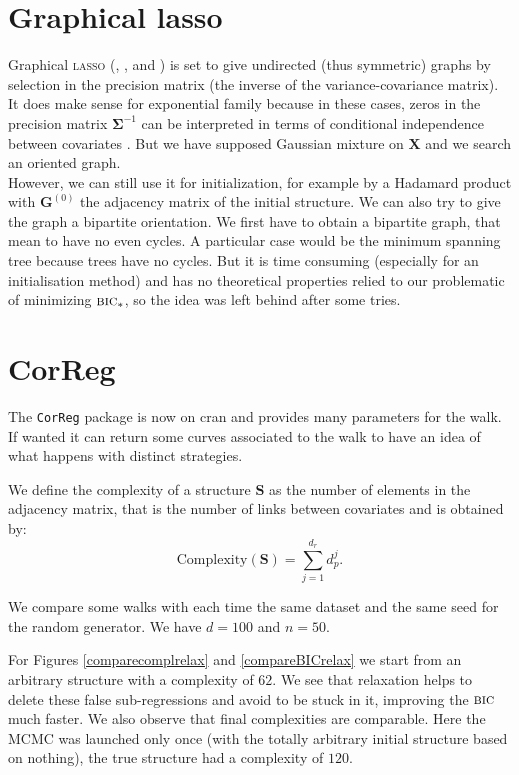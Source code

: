 \documentclass[12pt,a4paper]{report}
\begin{document}
	\section{Graphical { \sc lasso}}\label{sectionGlasso}
		Graphical \textsc{lasso} (\cite{friedman2008sparse}, \cite{witten2011new}, \cite{tibshiranilasso} and \cite{friedman2010applications}) is set to give undirected (thus symmetric) graphs by selection in the precision matrix (the inverse of the variance-covariance matrix). It does make sense for exponential family because in these cases, zeros in the precision matrix $\boldsymbol{\Sigma}^{-1}$ can be interpreted in terms of conditional independence between covariates \cite{dempster1972covariance}. But we have supposed Gaussian mixture on $\boldsymbol{X}$ and we search an oriented graph.\\
		
	However, we can still use it for initialization, for example by a Hadamard product with $\boldsymbol{G}^{(0)}$ the adjacency matrix of the initial structure. We can also try to give the graph a bipartite orientation. We first have to obtain a bipartite graph, that mean to have no even cycles. A particular case would be the minimum spanning tree \cite{graham1985history,moret1991empirical,gower1969minimum} because trees have no cycles. But it is time consuming (especially for an initialisation method) and has no theoretical properties relied to our problematic of minimizing $\mbox{{\sc bic}}_*$, so the idea was left behind after some tries.		
	
\section{CorReg}	
	The {\tt CorReg} package is now on {\sc cran} and provides many parameters for the walk. If wanted it can return some curves associated to the walk to have an idea of what happens with distinct strategies. 		
	
We define the complexity of a structure $\boldsymbol{S}$ as the number of elements in the adjacency matrix, that is the number of links between covariates and is obtained by:
\begin{equation}
	\textrm{Complexity}(\boldsymbol{S})=\sum_{j=1}^{d_r}d_p^j. \nonumber
\end{equation}	
	
		We compare some walks with each time the same dataset and the same seed for the random generator. We have $d=100$ and $n=50$.
		
		For Figures \ref{comparecomplrelax} and \ref{compareBICrelax} we start from an arbitrary structure with a complexity of $62$. We see that relaxation helps to delete these false sub-regressions and avoid to be stuck in it, improving the $\mbox{{\sc bic}}$ much faster. We also observe that final complexities are comparable. Here the MCMC was launched only once (with the totally arbitrary initial structure based on nothing), the true structure had a complexity of $120$.
		
\end{document}
